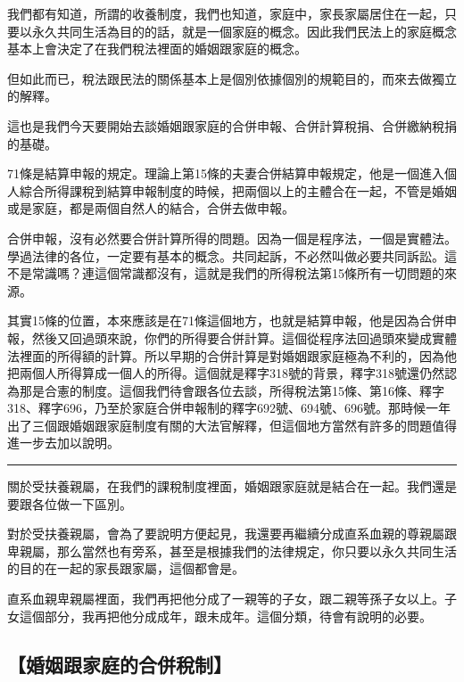 \documentclass[oneside,sub3section]{ctexbook}
\begin{document}
我們都有知道，所謂的收養制度，我們也知道，家庭中，家長家屬居住在一起，只要以永久共同生活為目的的話，就是一個家庭的概念。因此我們民法上的家庭概念基本上會決定了在我們稅法裡面的婚姻跟家庭的概念。

但如此而已，稅法跟民法的關係基本上是個別依據個別的規範目的，而來去做獨立的解釋。

這也是我們今天要開始去談婚姻跟家庭的合併申報、合併計算稅捐、合併繳納稅捐的基礎。

71條是結算申報的規定。理論上第15條的夫妻合併結算申報規定，他是一個進入個人綜合所得課稅到結算申報制度的時候，把兩個以上的主體合在一起，不管是婚姻或是家庭，都是兩個自然人的結合，合併去做申報。

合併申報，沒有必然要合併計算所得的問題。因為一個是程序法，一個是實體法。學過法律的各位，一定要有基本的概念。共同起訴，不必然叫做必要共同訴訟。這不是常識嗎？連這個常識都沒有，這就是我們的所得稅法第15條所有一切問題的來源。

其實15條的位置，本來應該是在71條這個地方，也就是結算申報，他是因為合併申報，然後又回過頭來說，你們的所得要合併計算。這個從程序法回過頭來變成實體法裡面的所得額的計算。所以早期的合併計算是對婚姻跟家庭極為不利的，因為他把兩個人所得算成一個人的所得。這個就是釋字318號的背景，釋字318號還仍然認為那是合憲的制度。這個我們待會跟各位去談，所得稅法第15條、第16條、釋字318、釋字696，乃至於家庭合併申報制的釋字692號、694號、696號。那時候一年出了三個跟婚姻跟家庭制度有關的大法官解釋，但這個地方當然有許多的問題值得進一步去加以說明。

\begin{center}\rule{0.5\linewidth}{0.5pt}\end{center}

關於受扶養親屬，在我們的課稅制度裡面，婚姻跟家庭就是結合在一起。我們還是要跟各位做一下區別。

對於受扶養親屬，會為了要說明方便起見，我還要再繼續分成直系血親的尊親屬跟卑親屬，那么當然也有旁系，甚至是根據我們的法律規定，你只要以永久共同生活的目的在一起的家長跟家屬，這個都會是。

直系血親卑親屬裡面，我們再把他分成了一親等的子女，跟二親等孫子女以上。子女這個部分，我再把他分成成年，跟未成年。這個分類，待會有說明的必要。

\hypertarget{ux5a5aux59fbux8ddfux5bb6ux5eadux7684ux5408ux4f75ux7a05ux5236}{%
\subsection{【婚姻跟家庭的合併稅制】}\label{ux5a5aux59fbux8ddfux5bb6ux5eadux7684ux5408ux4f75ux7a05ux5236}}
\end{document}
